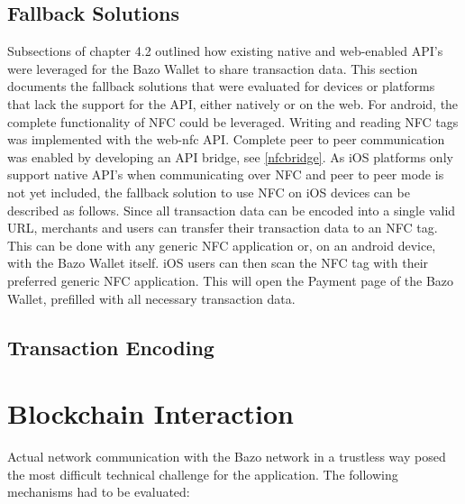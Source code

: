 \subsection{Fallback Solutions}
Subsections of chapter 4.2 outlined how existing native and web-enabled API's were leveraged for the Bazo Wallet to share transaction data. This section documents the fallback solutions that were evaluated for devices or platforms that lack the support for the API, either natively or on the web.
For android, the complete functionality of NFC could be leveraged. Writing and reading NFC tags was implemented with the web-nfc API. Complete peer to peer communication was enabled by developing an API bridge, see \ref{nfcbridge}.
As iOS platforms only support native API's when communicating over NFC and peer to peer mode is not yet included, the fallback solution to use NFC on iOS devices can be described as follows. Since all transaction data can be encoded into a single valid URL, merchants and users can transfer their transaction data to an NFC tag. This can be done with any generic NFC application or, on an android device, with the Bazo Wallet itself. iOS users can then scan the NFC tag with their preferred generic NFC application. This will open the Payment page of the Bazo Wallet, prefilled with all necessary transaction data.
\subsection{Transaction Encoding}

\section{Blockchain Interaction}\label{blockchaininteraction}
Actual network communication with the Bazo network in a trustless way posed the most difficult technical challenge for the application. The following mechanisms had to be evaluated:

